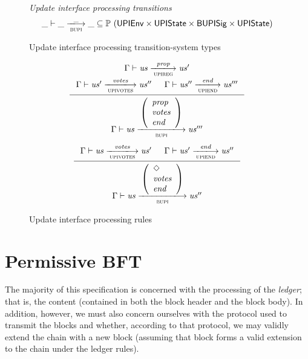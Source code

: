 \documentclass[11pt,a4paper]{article}
\newcommand{\powerset}[1]{\mathbb{P}~#1}
\newcommand{\var}[1]{\mathit{#1}}
\newcommand{\trans}[2]{\xlongrightarrow[\textsc{#1}]{#2}}
\newcommand{\Nothing}{\Diamond}
\begin{document}
\begin{figure}[ht]
  \emph{Update interface processing transitions}
  \begin{equation*}
    \_ \vdash \var{\_} \trans{bupi}{\_} \var{\_} \subseteq
    \powerset (\UPIEnv \times \UPIState \times \Bupisig \times \UPIState)
  \end{equation*}
  \caption{Update interface processing transition-system types}
  \label{fig:ts-types:bupi}
\end{figure}

\begin{figure}[ht]
  \begin{equation*}
    \inference
    { \Gamma \vdash \var{us} \trans{upireg}{\var{prop}} \var{us'}
      \\
      \Gamma \vdash \var{us'} \trans{upivotes}{\var{votes}} \var{us''}
      &
      \Gamma \vdash \var{us''} \trans{upiend}{\var{end}} \var{us'''}
    }
    {
      \Gamma \vdash
      {\var{us}}
      \trans{bupi}
      {
        \left(
          \begin{array}{l}
            \var{prop} \\
            \var{votes} \\
            \var{end}
          \end{array}
        \right)
      }
      {\var{us'''}}
    }
  \end{equation*}
  \vspace{20pt}
  \begin{equation*}
    \inference
    { \Gamma \vdash \var{us} \trans{upivotes}{\var{votes}} \var{us'}
      &
      \Gamma \vdash \var{us'} \trans{upiend}{\var{end}} \var{us''}
    }
    {
      \Gamma \vdash \var{us}
      \trans{bupi}{
        \left(
          \begin{array}{l}
            \Nothing \\
            \var{votes} \\
            \var{end}
          \end{array}
        \right)
      }
      \var{us''}
    }
  \end{equation*}
  \caption{Update interface processing rules}
  \label{fig:rules:bupi}
\end{figure}

\clearpage
\section{Permissive BFT}

The majority of this specification is concerned with the processing of the
\textit{ledger}; that is, the content (contained in both the block header and
the block body). In addition, however, we must also concern ourselves with the
protocol used to transmit the blocks and whether, according to that protocol, we
may validly extend the chain with a new block (assuming that block forms a valid
extension to the chain under the ledger rules).
\end{document}
